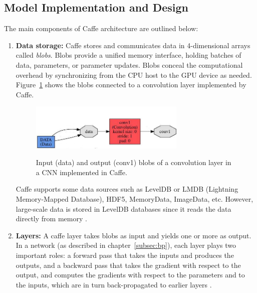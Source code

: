 \subsection{Model Implementation and Design}
The main components of Caffe architecture are outlined below:
\begin{enumerate}

\item \textbf{Data storage:} Caffe stores and communicates data in 4-dimensional arrays called \textit{blobs}. Blobs provide a unified memory interface, holding batches of data, parameters, or parameter updates. Blobs conceal the computational overhead by synchronizing from the CPU host to the GPU device as needed. Figure~\ref{fig:blob} shows the blobs connected to a convolution layer implemented by Caffe.


\begin{figure}[H]
	\centering
	{\includegraphics[width=0.7\textwidth]{images/caffeconvlayer}}
	\caption{Input (data) and output (conv1) blobs of a convolution layer in a CNN implemented in Caffe.}
	\label{fig:blob}
\end{figure}


Caffe supports some data sources such as LevelDB or LMDB (Lightning Memory-Mapped Database), HDF5, MemoryData, ImageData, etc. However, large-scale data is stored in LevelDB databases since it reads the data directly from memory \cite{caffe}. 
\item \textbf{Layers:} A caffe layer takes blobs as input and yields one or more as output. In a network (as described in chapter~\ref{subsec:bp}), each layer plays two important roles: a forward pass that takes the inputs and produces the outputs, and a backward pass that takes the gradient with respect to the output, and computes the gradients with respect to the parameters and to the inputs, which are in turn back-propagated to earlier layers \cite{jia2014caffe}.


\end{enumerate}
